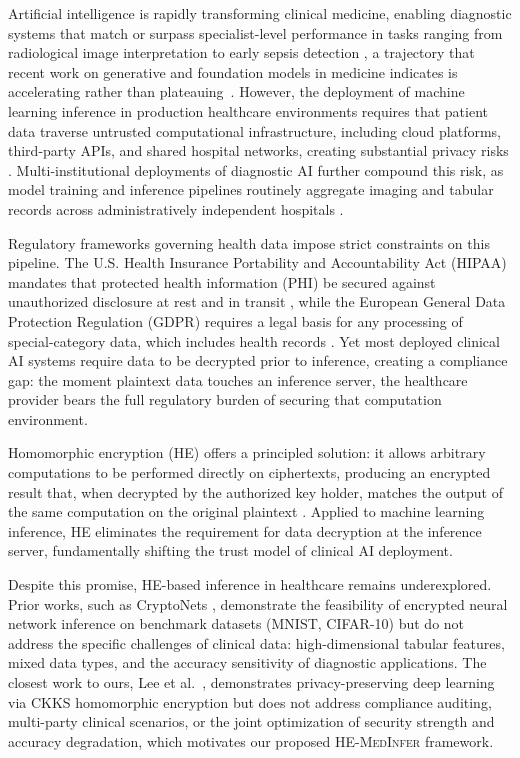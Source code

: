 \documentclass[journal,compsoc]{IEEEtran}
\newcommand{\framework}{\textsc{HE-MedInfer}}
\begin{document}
Artificial intelligence is rapidly transforming clinical medicine, enabling
diagnostic systems that match or surpass specialist-level performance in tasks
ranging from radiological image interpretation to early sepsis detection
\cite{rajpurkar2022ai,topol2019highperformance,esteva2019guide,miotto2018deep,
chowdhury2023survey}, a trajectory that recent
work on generative and foundation models in medicine indicates is
accelerating rather than plateauing~\cite{teo2025genai}.
However, the deployment of machine learning inference in production healthcare
environments requires that patient data traverse untrusted computational
infrastructure, including cloud platforms, third-party APIs, and shared
hospital networks, creating substantial privacy risks
\cite{price2019privacy,chen2019ehr}. Multi-institutional deployments of
diagnostic AI further compound this risk, as model training and inference
pipelines routinely aggregate imaging and tabular records across
administratively independent hospitals \cite{kaissis2021endtoend}.

Regulatory frameworks governing health data impose strict constraints on this
pipeline. The U.S. Health Insurance Portability and Accountability Act (HIPAA)
mandates that protected health information (PHI) be secured against unauthorized
disclosure at rest and in transit \cite{edemekong2023hipaa}, while the European
General Data Protection Regulation (GDPR) requires a legal basis for any
processing of special-category data, which includes health records
\cite{voigt2017gdpr}. Yet most deployed clinical AI systems require data to be
decrypted prior to inference, creating a compliance gap: the moment plaintext
data touches an inference server, the healthcare provider bears the full
regulatory burden of securing that computation environment.

Homomorphic encryption (HE) offers a principled solution: it allows arbitrary
computations to be performed directly on ciphertexts, producing an encrypted
result that, when decrypted by the authorized key holder, matches the output
of the same computation on the original plaintext \cite{gentry2009fully}.
Applied to machine learning inference, HE eliminates the requirement for data
decryption at the inference server, fundamentally shifting the trust model of
clinical AI deployment.

Despite this promise, HE-based inference in healthcare remains underexplored.
Prior works, such as CryptoNets \cite{gilad2016cryptonets}, demonstrate the feasibility of encrypted neural network
inference on benchmark datasets (MNIST, CIFAR-10) but do not address the
specific challenges of clinical data: high-dimensional tabular features,
mixed data types, and the accuracy sensitivity of diagnostic applications.
The closest work to ours, Lee et al.~\cite{lee2022privacypreserving},
demonstrates privacy-preserving deep learning via CKKS homomorphic encryption
but does not address compliance auditing, multi-party clinical scenarios, or
the joint optimization of security strength and accuracy degradation, which
motivates our proposed \framework{} framework.
\end{document}
